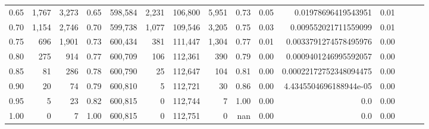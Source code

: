\begin{tabular}{rrrrrrrrrrrrrrr}
0.65 &    1,767 &   3,273 &  0.65 &  598,584 &    2,231 &  106,800 &    5,951 &  0.73 &  0.05 &     0.01978696419543951 &      0.01 \\
0.70 &    1,154 &   2,746 &  0.70 &  599,738 &    1,077 &  109,546 &    3,205 &  0.75 &  0.03 &    0.009552021711559099 &      0.01 \\
0.75 &      696 &   1,901 &  0.73 &  600,434 &      381 &  111,447 &    1,304 &  0.77 &  0.01 &   0.0033791274578495976 &      0.00 \\
0.80 &      275 &     914 &  0.77 &  600,709 &      106 &  112,361 &      390 &  0.79 &  0.00 &   0.0009401246995592057 &      0.00 \\
0.85 &       81 &     286 &  0.78 &  600,790 &       25 &  112,647 &      104 &  0.81 &  0.00 &  0.00022172752348094475 &      0.00 \\
0.90 &       20 &      74 &  0.79 &  600,810 &        5 &  112,721 &       30 &  0.86 &  0.00 &  4.4345504696188944e-05 &      0.00 \\
0.95 &        5 &      23 &  0.82 &  600,815 &        0 &  112,744 &        7 &  1.00 &  0.00 &                     0.0 &      0.00 \\
1.00 &        0 &       7 &  1.00 &  600,815 &        0 &  112,751 &        0 &   nan &  0.00 &                     0.0 &      0.00 \\
\bottomrule
\end{tabular}
